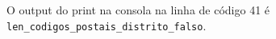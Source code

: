 \documentclass[12pt,varwidth=16cm,border=1pt]{standalone}
\begin{document}
O output do print na consola na linha de código 41 é \verb+len_codigos_postais_distrito_falso+. 
\end{document}
